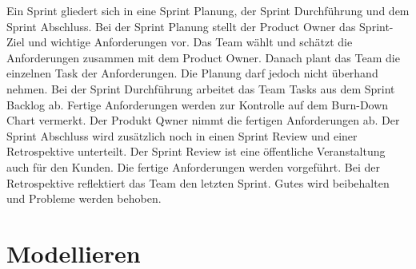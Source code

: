 Ein Sprint gliedert sich in eine Sprint Planung, der Sprint Durchführung und dem Sprint Abschluss. 
Bei der Sprint Planung stellt der Product Owner das Sprint-Ziel und wichtige Anforderungen vor. Das Team wählt und schätzt die Anforderungen zusammen mit dem Product Owner. Danach plant das Team die einzelnen Task der Anforderungen. Die Planung darf jedoch nicht überhand nehmen.
Bei der Sprint Durchführung arbeitet das Team Tasks aus dem Sprint Backlog ab. Fertige Anforderungen werden zur Kontrolle auf dem Burn-Down Chart vermerkt. Der Produkt Qwner nimmt die fertigen Anforderungen ab. 
Der Sprint Abschluss wird zusätzlich noch in einen Sprint Review und einer Retrospektive unterteilt. Der Sprint Review ist eine öffentliche Veranstaltung auch für den Kunden. Die fertige Anforderungen werden vorgeführt. Bei der Retrospektive reflektiert das Team den letzten Sprint. Gutes wird beibehalten und Probleme werden behoben.

\section{Modellieren}